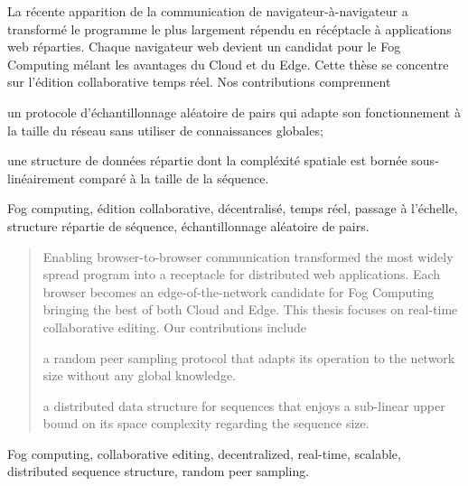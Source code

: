 
\begin{resume}
  La récente apparition de la communication de navigateur-à-navigateur a
  transformé le programme le plus largement répendu en récéptacle à applications
  web réparties. Chaque navigateur web devient un candidat pour le Fog Computing
  mélant les avantages du Cloud et du Edge. Cette thèse se concentre sur
  l'édition collaborative temps réel. Nos contributions comprennent
  \begin{inparaenum}[(i)]
  \item un protocole d'échantillonnage aléatoire de pairs qui adapte son
    fonctionnement à la taille du réseau sans utiliser de connaissances
    globales;
  \item une structure de données répartie dont la compléxité spatiale est bornée
    sous-linéairement comparé à la taille de la séquence.
  \end{inparaenum}
\end{resume}

\begin{motscles}
  Fog computing, édition collaborative, décentralisé, temps réel, passage à
  l'échelle, structure répartie de séquence, échantillonnage aléatoire de pairs.
\end{motscles}

\begin{abstract}
  Enabling browser-to-browser communication transformed the most widely spread
  program into a receptacle for distributed web applications. Each browser
  becomes an edge-of-the-network candidate for Fog Computing bringing the best
  of both Cloud and Edge. This thesis focuses on real-time collaborative editing. Our
  contributions include
  \begin{inparaenum}[(i)]
  \item a random peer sampling protocol that adapts its operation to the network
    size without any global knowledge. 
  \item a distributed data structure for sequences that enjoys a sub-linear
    upper bound on its space complexity regarding the sequence size.
  \end{inparaenum}
\end{abstract}

\begin{keywords}
  Fog computing, collaborative editing, decentralized, real-time, scalable,
  distributed sequence structure, random peer sampling.
\end{keywords}


